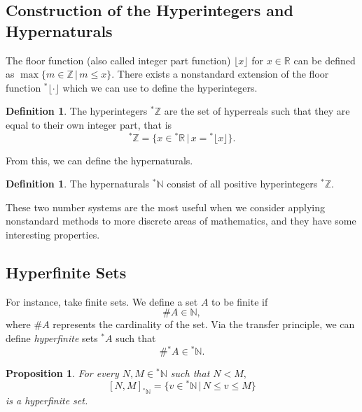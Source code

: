 \documentclass[12pt]{amsart}
\newcommand{\stt}{{}^*}
\newcommand{\NN}{\mathbb{N}}
\newcommand{\RR}{\mathbb{R}}
\newcommand{\ZZ}{\mathbb{Z}}
\theoremstyle{plain}
\newtheorem{prop}[thm]{Proposition}
\theoremstyle{definition}
\newtheorem{defn}[thm]{Definition}
\theoremstyle{remark}
\theoremstyle{theorem}
\numberwithin{equation}{section}
\numberwithin{thm}{section}
\begin{document}
\subsection{Construction of the Hyperintegers and Hypernaturals}
The floor function (also called integer part function) $\lfloor x \rfloor$ for $x \in \RR$ can be defined as $\max \{m \in \ZZ \, | \, m \leq x \}.$ There exists a nonstandard extension of the floor function $\stt \lfloor \cdot \rfloor$ which we can use to define the hyperintegers.
\begin{defn}
The hyperintegers $\stt \ZZ$ are the set of hyperreals such that they are equal to their own integer part, that is
\[\stt \ZZ = \{x \in \stt \RR \, | \, x = \stt \lfloor x \rfloor \}. \]
\end{defn}
From this, we can define the hypernaturals.
\begin{defn}
The hypernaturals $\stt \NN$ consist of all positive hyperintegers $\stt \ZZ.$
\end{defn}
These two number systems are the most useful when we consider applying nonstandard methods to more discrete areas of mathematics, and they have some interesting properties.

\subsection{Hyperfinite Sets}
For instance, take finite sets. We define a set $A$ to be finite if \[\#A \in \NN,\] where $\#A$ represents the cardinality of the set. Via the transfer principle, we can define \textit{hyperfinite} sets $\stt A$ such that \[\# \stt A \in \stt \NN.\]
\begin{prop}
For every $N, M \in \stt \NN$ such that $N < M,$
\[[N, M] _{\stt \NN} = \{v \in \stt \NN \, | \, N \leq v \leq M \} \] is a hyperfinite set.
\end{prop}
\end{document}
